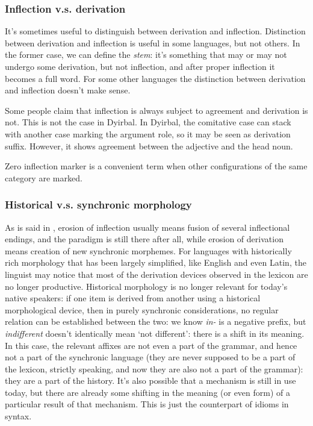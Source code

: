 \documentclass[UTF8, a4paper, oneside, scheme=plain]{ctexart}
\newcommand*{\term}[1]{\emph{#1}}
\newcommand*{\corpus}[1]{\emph{#1}}
\newcommand*{\translate}[1]{`#1'}
\begin{document}
\subsubsection{Inflection v.s. derivation}\label{sec:inflection-derivation}

It's sometimes useful to distinguish between derivation and inflection. 
Distinction between derivation and inflection is useful in some languages, but not others. 
In the former case, we can define the \term{stem}: it's something that may or may not undergo some derivation, 
but not inflection, and after proper inflection it becomes a full word. 
For some other languages the distinction between derivation and inflection doesn't make sense. 

Some people claim that inflection is always subject to agreement and derivation is not. 
This is not the case in Dyirbal. 
In Dyirbal, the comitative case can stack with another case marking the argument role, 
so it may be seen as derivation suffix. 
However, it shows agreement between the adjective and the head noun.

Zero inflection marker is a convenient term when other configurations of the same category are marked.

\subsubsection{Historical v.s. synchronic morphology}\label{sec:history-or-current-morphology}

As is said in ,
erosion of inflection usually means fusion of several inflectional endings,
and the paradigm is still there after all,
while erosion of derivation means creation of new synchronic morphemes.
For languages with historically rich morphology
that has been largely simplified, 
like English and even Latin, 
the linguist may notice that most of the derivation devices observed in the lexicon 
are no longer productive.
Historical morphology is no longer relevant for today's native speakers:
if one item is derived from another using a historical morphological device,
then in purely synchronic considerations,
no regular relation can be established between the two:
we know \corpus{in-} is a negative prefix, 
but \corpus{indifferent} doesn't identically mean \translate{not different}:
there is a shift in its meaning.
In this case, the relevant affixes are not even a part of the grammar,
and hence not a part of the synchronic language
(they are never supposed to be a part of the lexicon, strictly speaking,
and now they are also not a part of the grammar):
they are a part of the history.
It's also possible that a mechanism is still in use today,
but there are already some shifting in the meaning (or even form) 
of a particular result of that mechanism.
This is just the counterpart of idioms in syntax.
\end{document}
